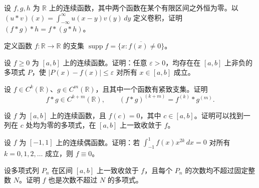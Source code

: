 \newpage
\noindent\begin{minipage}{\textwidth}
设 $f,g,h$ 为 $\mathbb R$ 上的连续函数，其中两个函数在某个有限区间之外恒为零。以 $(u*v)(x)=\int_{-\infty}^{\infty}u(x-y)v(y)\,dy$ 定义卷积，证明 $(f*g)*h=f*(g*h)$。
\end{minipage}\par\vfill
\noindent\begin{minipage}{\textwidth}
定义函数 $f:\mathbb R\to\mathbb R$ 的支集 $\operatorname{supp}f=\overline{\{x:f(x)\ne0\}}$。
\end{minipage}\par\vfill
\noindent\begin{minipage}{\textwidth}
设 $f\ge0$ 为 $[a,b]$ 上的连续函数。证明：任意 $\varepsilon>0$，均存在在 $[a,b]$ 上非负的多项式 $P$，使 $|P(x)-f(x)|\le\varepsilon$ 对所有 $x\in[a,b]$ 成立。
\end{minipage}\par\vfill
\noindent\begin{minipage}{\textwidth}
设 $f\in C^k(\mathbb R)$、$g\in C^m(\mathbb R)$，且其中一个函数有紧致支集。证明\[f*g\in C^{k+m}(\mathbb R),\qquad(f*g)^{(k+m)}=f^{(k)}*g^{(m)}.\]
\end{minipage}\par\vfill
\newpage
\noindent\begin{minipage}{\textwidth}
设 $f$ 为 $[a,b]$ 上的连续函数，且 $f(c)=0$，其中 $c\in[a,b]$。证明可以找到一列在 $c$ 处均为零的多项式，在 $[a,b]$ 上一致收敛于 $f$。
\end{minipage}\par\vfill
\noindent\begin{minipage}{\textwidth}
设 $f$ 为 $[-1,1]$ 上的连续偶函数。证明：若 $\int_{-1}^1f(x)x^{2k}\,dx=0$ 对所有 $k=0,1,2,\ldots$ 成立，则 $f\equiv0$。
\end{minipage}\par\vfill
\noindent\begin{minipage}{\textwidth}
设多项式列 $P_n$ 在区间 $[a,b]$ 上一致收敛于 $f$，且每个 $P_n$ 的次数均不超过固定整数 $N$。证明 $f$ 也是次数不超过 $N$ 的多项式。
\end{minipage}\par\vfill
